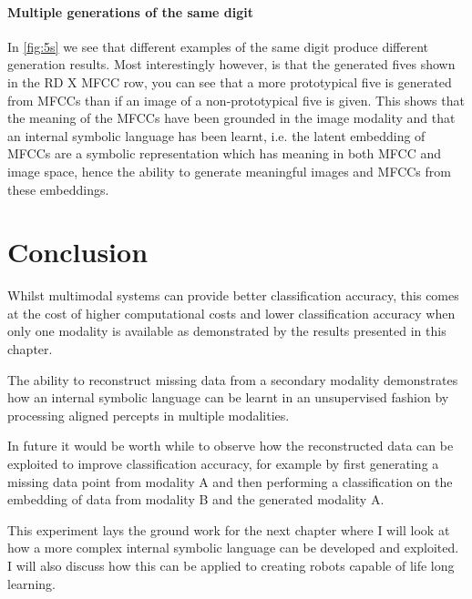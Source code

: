 \paragraph{Multiple generations of the same digit}
In \autoref{fig:5s} we see that different examples of the same digit produce different generation results. Most interestingly however, is that the generated fives shown in the RD X MFCC row, you can see that a more prototypical five is generated from MFCCs than if an image of a non-prototypical five is given. This shows that the meaning of the MFCCs have been grounded in the image modality and that an internal symbolic language has been learnt, i.e. the latent embedding of MFCCs are a symbolic representation which has meaning in both MFCC and image space, hence the ability to generate meaningful images and MFCCs from these embeddings.

\section{Conclusion}
Whilst multimodal systems can provide better classification accuracy, this comes at the cost of higher computational costs and lower classification accuracy when only one modality is available as demonstrated by the results presented in this chapter.

The ability to reconstruct missing data from a secondary modality demonstrates how an internal symbolic language can be learnt in an unsupervised fashion by processing aligned percepts in multiple modalities.

In future it would be worth while to observe how the reconstructed data can be exploited to improve classification accuracy, for example by first generating a missing data point from modality A and then performing a classification on the embedding of data from modality B and the generated modality A.

This experiment lays the ground work for the next chapter where I will look at how a more complex internal symbolic language can be developed and exploited. I will also discuss how this can be applied to creating robots capable of life long learning. 
